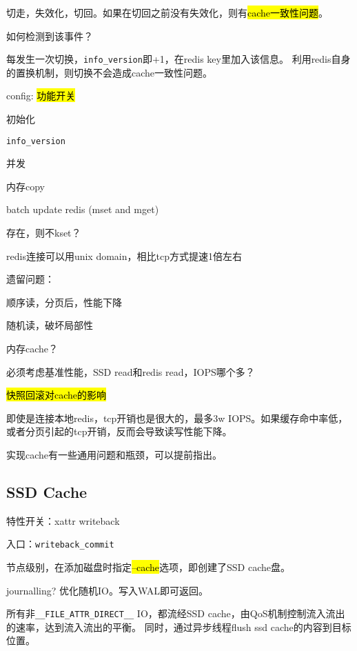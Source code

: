 切走，失效化，切回。如果在切回之前没有失效化，则有\hl{cache一致性问题}。

如何检测到该事件？

\begin{tcolorbox}
每发生一次切换，\verb|info_version|即+1，在redis key里加入该信息。
利用redis自身的置换机制，则切换不会造成cache一致性问题。
\end{tcolorbox}

\begin{compactenum}
\item config: \hl{功能开关}
\item 初始化
\item \verb|info_version|
\item 并发
\item 内存copy
\item batch update redis (mset and mget)
\item 存在，则不kset？
\item redis连接可以用unix domain，相比tcp方式提速1倍左右
\end{compactenum}

遗留问题：
\begin{enumbox}
\item 顺序读，分页后，性能下降
\item 随机读，破坏局部性
\item 内存cache？
\item 必须考虑基准性能，SSD read和redis read，IOPS哪个多？
\item \hl{快照回滚对cache的影响}
\end{enumbox}

即使是连接本地redis，tcp开销也是很大的，最多3w IOPS。如果缓存命中率低，或者分页引起的tcp开销，反而会导致读写性能下降。

实现cache有一些通用问题和瓶颈，可以提前指出。

\subsection{SSD Cache}

特性开关：xattr writeback

入口：\verb|writeback_commit|

节点级别，在添加磁盘时指定\hl{--cache}选项，即创建了SSD cache盘。

journalling? 优化随机IO。写入WAL即可返回。

所有非\verb|__FILE_ATTR_DIRECT__| IO，都流经SSD cache，由QoS机制控制流入流出的速率，达到流入流出的平衡。
同时，通过异步线程flush ssd cache的内容到目标位置。

